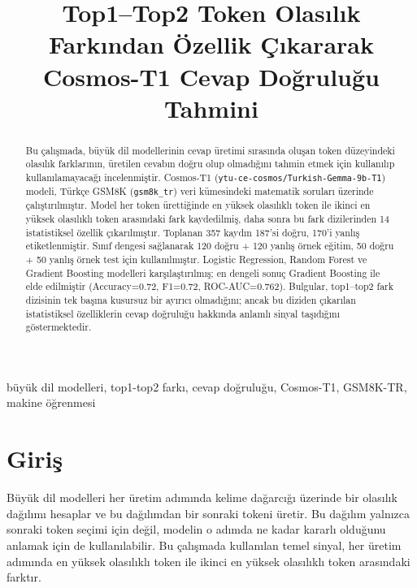 \documentclass[conference]{IEEEtran}
\begin{document}
\title{Top1--Top2 Token Olasılık Farkından Özellik Çıkararak\\
Cosmos-T1 Cevap Doğruluğu Tahmini}

\author{
}

\maketitle

\begin{abstract}
Bu çalışmada, büyük dil modellerinin cevap üretimi sırasında oluşan token
düzeyindeki olasılık farklarının, üretilen cevabın doğru olup olmadığını tahmin
etmek için kullanılıp kullanılamayacağı incelenmiştir. Cosmos-T1
(\texttt{ytu-ce-cosmos/Turkish-Gemma-9b-T1}) modeli, Türkçe GSM8K
(\texttt{gsm8k\_tr}) veri kümesindeki matematik soruları üzerinde
çalıştırılmıştır. Model her token ürettiğinde en yüksek olasılıklı token ile
ikinci en yüksek olasılıklı token arasındaki fark kaydedilmiş, daha sonra bu
fark dizilerinden 14 istatistiksel özellik çıkarılmıştır. Toplanan 357 kaydın
187'si doğru, 170'i yanlış etiketlenmiştir. Sınıf dengesi sağlanarak 120 doğru
+ 120 yanlış örnek eğitim, 50 doğru + 50 yanlış örnek test için kullanılmıştır.
Logistic Regression, Random Forest ve Gradient Boosting modelleri
karşılaştırılmış; en dengeli sonuç Gradient Boosting ile elde edilmiştir
(Accuracy=0.72, F1=0.72, ROC-AUC=0.762). Bulgular, top1--top2 fark dizisinin
tek başına kusursuz bir ayırıcı olmadığını; ancak bu diziden çıkarılan
istatistiksel özelliklerin cevap doğruluğu hakkında anlamlı sinyal taşıdığını
göstermektedir.
\end{abstract}

\begin{IEEEkeywords}
büyük dil modelleri, top1-top2 farkı, cevap doğruluğu, Cosmos-T1, GSM8K-TR,
makine öğrenmesi
\end{IEEEkeywords}

\section{Giriş}

Büyük dil modelleri her üretim adımında kelime dağarcığı üzerinde bir olasılık
dağılımı hesaplar ve bu dağılımdan bir sonraki tokeni üretir. Bu dağılım yalnızca
sonraki token seçimi için değil, modelin o adımda ne kadar kararlı olduğunu
anlamak için de kullanılabilir. Bu çalışmada kullanılan temel sinyal,
her üretim adımında en yüksek olasılıklı token ile ikinci en yüksek olasılıklı
token arasındaki farktır.
\end{document}
